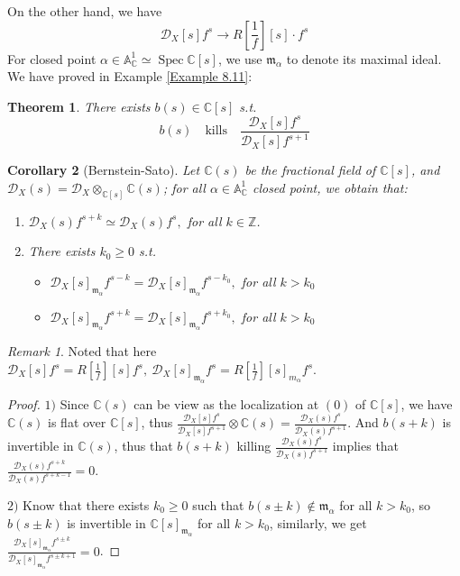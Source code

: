 \documentclass[openany]{book}
\newtheorem{theorem}{Theorem}[chapter] %
\newtheorem{corollary}[theorem]{Corollary}   %
\theoremstyle{definition} %
\theoremstyle{remark}
\newtheorem{remark}{Remark}[chapter] %
\begin{document}
On the other hand, we have $$ \mathcal{D}_{X}[s]f^{s} \longrightarrow R[\frac{1}{f}][s] \cdot f^{s} $$For closed point $\alpha \in \mathbb{A}_{\mathbb{C}}^{1} \simeq \operatorname{Spec} \mathbb{C}[s]$, we use $\mathfrak{m}_{\alpha}$ to denote its maximal ideal. We have proved in Example \ref{Example 8.11}:

\begin{theorem}
    There exists $b(s) \in \mathbb{C}[s]$ s.t.$$b(s) \quad \text{kills} \quad \frac{\mathcal{D}_{X}[s]f^{s}}{\mathcal{D}_{X}[s]f^{s+1}}$$
\end{theorem}



\begin{corollary}[Bernstein-Sato]
    Let $\mathbb{C}(s)$ be the fractional field of $\mathbb{C}[s]$, and $\mathcal{D}_{X}(s) = \mathcal{D}_{X} \otimes_{\mathbb{C}[s]} \mathbb{C}(s)$; for all $\alpha \in \mathbb{A}_{\mathbb{C}}^{1}$ closed point, we obtain that:
    \begin{enumerate}
        \item $\mathcal{D}_{X}(s) f^{s+k} \simeq \mathcal{D}_{X}(s) f^{s}, $ for all $  k \in \mathbb{Z}$.
        \item There exists $k_{0} \geqslant 0$ s.t.
              \begin{itemize}
                  \item $\mathcal{D}_{X}[s]_{\mathfrak{m}_{\alpha}} f^{s-k} = \mathcal{D}_{X}[s]_{\mathfrak{m}_{\alpha}} f^{s-k_{0}}, $ for all $ k > k_{0}$
                  \item $\mathcal{D}_{X}[s]_{\mathfrak{m}_{\alpha}} f^{s+k} = \mathcal{D}_{X}[s]_{\mathfrak{m}_{\alpha}} f^{s+k_{0}},$ for all $  k > k_{0}$
              \end{itemize}
    \end{enumerate}

\end{corollary}
\begin{remark}
    Noted that here  $\mathcal{D}_{X}[s] f^{s} = R[\frac{1}{f}][s] f^{s},\ \mathcal{D}_{X}[s]_{\mathfrak{m}_{\alpha}} f^{s} = R[\frac{1}{f}][s]_{m_{\alpha}} f^{s}$.
\end{remark}
\begin{proof}
    $1)$ Since $\mathbb{C}(s)$ can be view as the localization at $(0)$ of $\mathbb{C}[s]$, we have $\mathbb{C}(s)$ is flat over $\mathbb{C}[s]$, thus $\frac{\mathcal{D}_{X}[s]f^{s}}{\mathcal{D}_{X}[s]f^{s+1}}\otimes \mathbb{C}(s)=\frac{\mathcal{D}_{X}(s)f^{s}}{\mathcal{D}_{X}(s)f^{s+1}}$.  And $b(s+k)$ is invertible in $\mathbb{C}(s)$, thus that $b(s+k)$ killing $\frac{\mathcal{D}_{X}(s)f^{s}}{\mathcal{D}_{X}(s)f^{s+1}}$ implies that $\frac{\mathcal{D}_X(s) f^{s+k}}{\mathcal{D}_X(s) f^{s+k-1}} = 0$.

    $2)$  Know that there exists $k_0 \ge 0$ such that $b(s \pm k) \notin \mathfrak{m}_\alpha$ for all $k > k_0$, so $b(s \pm k)$ is invertible in $\mathbb{C}[s]_{\mathfrak{m}_\alpha}$ for all $k > k_0$, similarly, we get $\frac{\mathcal{D}_X[s]_{\mathfrak{m}_\alpha} f^{s \pm k}}{\mathcal{D}_X[s]_{\mathfrak{m}_\alpha} f^{s \pm k + 1}} = 0$.
\end{proof}
\end{document}
